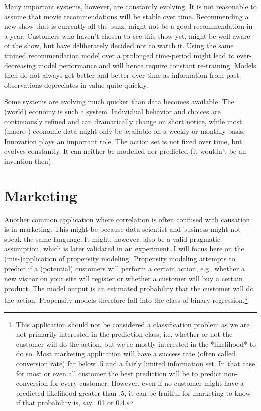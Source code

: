 \documentclass[
]{book}
\theoremstyle{definition}
\theoremstyle{definition}
\theoremstyle{definition}
\theoremstyle{remark}
\begin{document}
Many important systems, however, are constantly evolving. It is not reasonable to assume that movie recommendations will be stable over time. Recommending a new show that is currently all the buzz, might not be a good recommendation in a year. Customers who haven't chosen to see this show yet, might be well aware of the show, but have deliberately decided not to watch it. Using the same trained recommendation model over a prolonged time-period might lead to ever-decreasing model performance and will hence require constant re-training. Models then do not always get better and better over time as information from past observations depreciates in value quite quickly.

Some systems are evolving much quicker than data becomes available. The (world) economy is such a system. Individual behavior and choices are continuously refined and can dramatically change on short notice, while most (macro-) economic data might only be available on a weekly or monthly basis.
Innovation plays an important role. The action set is not fixed over time, but evolves constantly. It can neither be modelled nor predicted (it wouldn't be an invention then)

\hypertarget{marketing}{%
\section{Marketing}\label{marketing}}

Another common application where correlation is often confused with causation is in marketing. This might be because data scientist and business might not speak the same language. It might, however, also be a valid pragmatic assumption, which is later validated in an experiment.
I will focus here on the (mis-)application of propensity modeling. Propensity modeling attempts to predict if a (potential) customers will perform a certain action, e.g.~whether a new visitor on your site will register or whether a customer will buy a certain product. The model output is an estimated probability that the customer will do the action. Propensity models therefore fall into the class of binary regression.\footnote{This application should not be considered a classification problem as we are not primarily interested in the prediction class, i.e. whether or not the customer will do the action, but we're mostly interested in the *likelihood* to do so. Most marketing application will have a success rate (often called conversion rate) far below .5 and a fairly limited information set. In that case for most or even all customer the best prediction will be to predict non-conversion for every customer. However, even if no customer might have a predicted likelihood greater than .5, it can be fruitful for marketing to know if that probability is, say, .01 or 0.4.}
\end{document}
